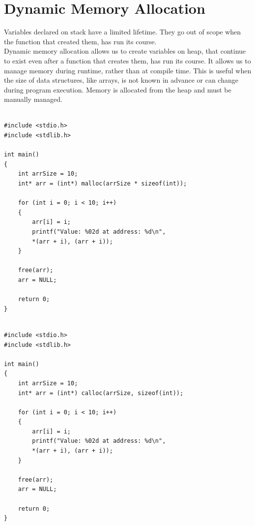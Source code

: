 \documentclass[12pt]{article}
\begin{document}
\newpage
{}
\part*{\centering Dynamic Memory Allocation}

\noindent Variables declared on stack have a limited lifetime. They go out of scope when the function that created them, has run its course. \\

\noindent Dynamic memory allocation allows us to create variables on heap, that continue to exist even after a function that creates them, has run its course. It allows us to manage memory during 
runtime, rather than at compile time. This is useful when the size of data structures, like arrays, is not known in advance or can change during program execution. Memory is allocated from 
the heap and must be manually managed. \\

\begin{verbatim}

#include <stdio.h>
#include <stdlib.h>

int main()
{
    int arrSize = 10;
    int* arr = (int*) malloc(arrSize * sizeof(int));

    for (int i = 0; i < 10; i++)
    {
        arr[i] = i;
        printf("Value: %02d at address: %d\n", 
        *(arr + i), (arr + i));
    }

    free(arr);
    arr = NULL;

    return 0;
}

\end{verbatim}

\newpage

\begin{verbatim}

#include <stdio.h>
#include <stdlib.h>

int main()
{
    int arrSize = 10;
    int* arr = (int*) calloc(arrSize, sizeof(int));

    for (int i = 0; i < 10; i++)
    {
        arr[i] = i;
        printf("Value: %02d at address: %d\n", 
        *(arr + i), (arr + i));
    }

    free(arr);
    arr = NULL;

    return 0;
}

\end{verbatim}

\vspace{1cm}
\end{document}
